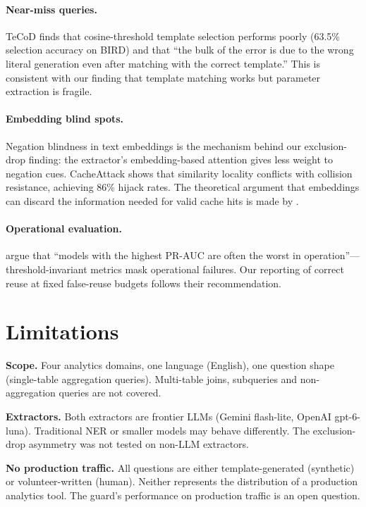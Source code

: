 \documentclass[11pt,a4paper]{article}
\begin{document}
\paragraph{Near-miss queries.} TeCoD \cite{jivani2026tecod} finds that
cosine-threshold template selection performs poorly (63.5\% selection
accuracy on BIRD) and that ``the bulk of the error is due to the wrong
literal generation even after matching with the correct template.'' This
is consistent with our finding that template matching works but parameter
extraction is fragile.

\paragraph{Embedding blind spots.} Negation blindness in text embeddings
\cite{cao2025negation} is the mechanism behind our exclusion-drop
finding: the extractor's embedding-based attention gives less weight to
negation cues. CacheAttack \cite{zhang2026cacheattack} shows that
similarity locality conflicts with collision resistance, achieving 86\%
hijack rates. The theoretical argument that embeddings can discard the
information needed for valid cache hits is made by
\citet{zhang2026validity}.

\paragraph{Operational evaluation.} \citet{baral2026operational} argue
that ``models with the highest PR-AUC are often the worst in
operation''---threshold-invariant metrics mask operational failures. Our
reporting of correct reuse at fixed false-reuse budgets follows their
recommendation.

\section{Limitations}
\label{sec:limitations}

\textbf{Scope.} Four analytics domains, one language (English), one
question shape (single-table aggregation queries). Multi-table joins,
subqueries and non-aggregation queries are not covered.

\textbf{Extractors.} Both extractors are frontier LLMs (Gemini flash-lite,
OpenAI gpt-6-luna). Traditional NER or smaller models may behave
differently. The exclusion-drop asymmetry was not tested on non-LLM
extractors.

\textbf{No production traffic.} All questions are either template-generated
(synthetic) or volunteer-written (human). Neither represents the
distribution of a production analytics tool. The guard's performance on
production traffic is an open question.
\end{document}
